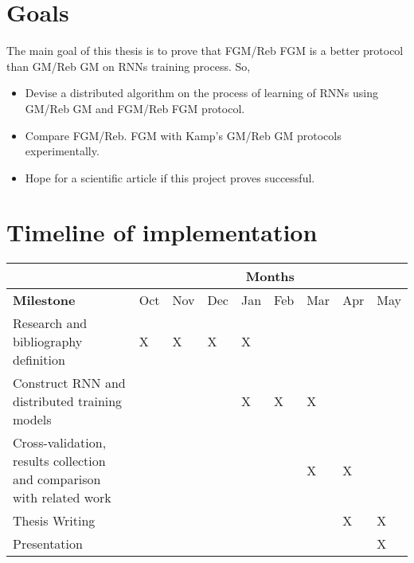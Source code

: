 \documentclass{article}
\begin{document}
    \section*{Goals}
    The main goal of this thesis is to prove that FGM/Reb FGM is a better protocol than GM/Reb GM on RNNs training process.
    So, \\
    \begin{itemize}
        \item Devise a distributed algorithm on the process of learning of RNNs using GM/Reb GM and FGM/Reb FGM protocol.
        \item Compare FGM/Reb.
        FGM with Kamp's GM/Reb GM protocols experimentally.
        \item Hope for a scientific article if this project proves successful.
    \end{itemize}

    \newpage
    \section*{Timeline of implementation}
    \begin{center}
        \begin{tabular}{|p{3.5cm}|p{0.5cm}|p{0.5cm}|p{0.5cm}|p{0.5cm}|p{0.5cm}|p{0.5cm}|p{0.5cm}|p{0.5cm}|}
            \hline
            \cellcolor{gray} & \multicolumn{8}{c|}{Months} \\
            \hline
            \textbf{Milestone} & Oct & Nov & Dec & Jan & Feb & Mar & Apr & May \\
            \hline
            Research and bibliography definition & X & X & X & X & & & &   \\
            \hline
            Construct RNN and distributed training models & & & & X & X & X & &   \\
            \hline
            Cross-validation, results collection and comparison with related work & & & & & & X & X &   \\
            \hline
            Thesis Writing & & & & & & & X & X  \\
            \hline
            Presentation & & & & & & & & X  \\
            \hline
        \end{tabular}
    \end{center}

    \section*{}~\nocite{*}

%    
%    
    \printbibliography
\end{document}
